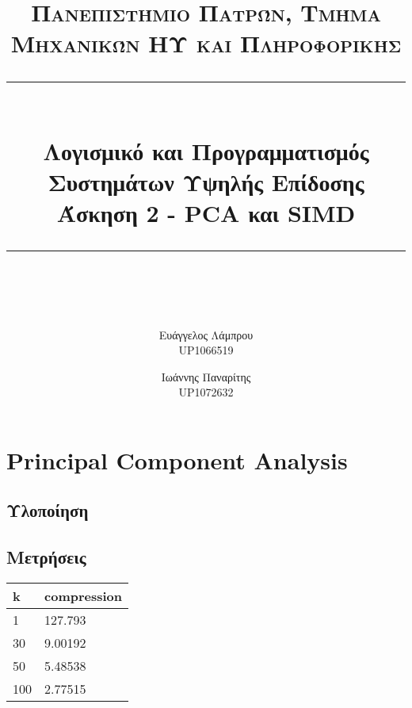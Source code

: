 \documentclass[11pt]{scrartcl} %
\title{	
	\normalfont\normalsize
	\textsc{Πανεπιστήμιο Πατρών, Τμήμα Μηχανικών ΗΥ και Πληροφορικής}\\ %
	\vspace{25pt} %
	\rule{\linewidth}{0.5pt}\\ %
	\vspace{20pt} %
	{\LARGE Λογισμικό και Προγραμματισμός Συστημάτων Υψηλής Επίδοσης\\ Άσκηση 2 - PCA και SIMD}\\ %
	\vspace{12pt} %
	\rule{\linewidth}{2pt}\\ %
	\vspace{12pt} %
}
\author{Ευάγγελος Λάμπρου \\UP1066519 \and Ιωάννης Παναρίτης \\UP1072632} %
\date{} %
\begin{document}
\maketitle 

\section{Principal Component Analysis}

\subsection{Υλοποίηση}


\subsection{Μετρήσεις}

\begin{table}[!ht]
    \centering
    \begin{tabular}{|l|l|}
    \hline
        \textbf{k} & \textbf{compression} \\ \hline
        1 & 127.793 \\ \hline
        30 & 9.00192 \\ \hline
        50 & 5.48538 \\ \hline
        100 & 2.77515 \\ \hline
    \end{tabular}
\end{table}
\end{document}
